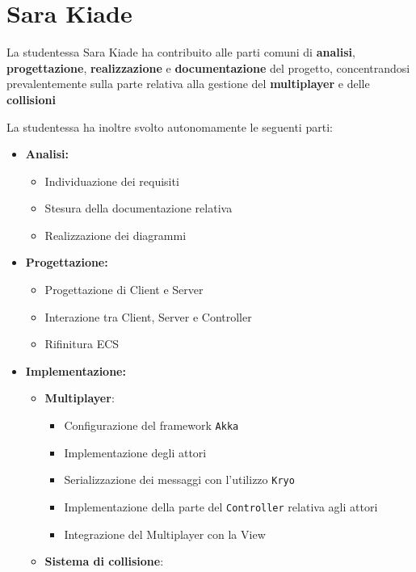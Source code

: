 \section{Sara Kiade}
La studentessa Sara Kiade ha contribuito alle parti comuni di \textbf{analisi}, \textbf{progettazione}, \textbf{realizzazione} e \textbf{documentazione} del progetto, concentrandosi prevalentemente sulla parte relativa alla gestione del \textbf{multiplayer} e delle \textbf{collisioni} 

La studentessa ha inoltre svolto autonomamente le seguenti parti:

\begin{itemize}
    \item \textbf{Analisi:}
        \begin{itemize}
            \item Individuazione dei requisiti
            \item Stesura della documentazione relativa
            \item Realizzazione dei diagrammi
        \end{itemize}
    \item \textbf{Progettazione:}
        \begin{itemize}
            \item Progettazione di Client e Server
            \item Interazione tra Client, Server e Controller
            \item Rifinitura ECS
        \end{itemize}
    \item \textbf{Implementazione:}
        \begin{itemize}
            \item \textbf{Multiplayer}:
                \begin{itemize}
                    \item Configurazione del framework \texttt{Akka}
                    \item Implementazione degli attori
                    \item Serializzazione dei messaggi con l'utilizzo \texttt{Kryo}
                    \item Implementazione della parte del \texttt{Controller} relativa agli attori
                    \item Integrazione del Multiplayer con la View
                \end{itemize}
            \item \textbf{Sistema di collisione}: 

\end{itemize}
\end{itemize}
